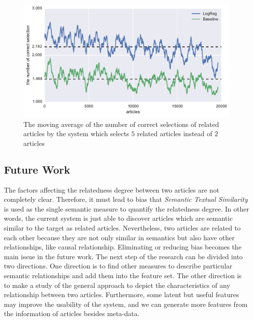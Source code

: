 \begin{figure}[!htb]
    \centering
    \includegraphics[width=\textwidth]{fig/precision_inc_supervised_5}
    \caption[The moving average of the number of correct selection of related articles by the system which selects $5$ related articles]{The moving average of the number of correct selections of related articles by the system which selects $5$ related articles instead of $2$ articles}
    \label{fig:top5}
\end{figure}

\subsection{Future Work}

The factors affecting the relatedness degree between two articles are not completely clear. Therefore, it must lead to bias that \textit{Semantic Textual Similarity} is used as the single semantic measure to quantify the relatedness degree. In other words, the current system is just able to discover articles which are semantic similar to the target as related articles. Nevertheless, two articles are related to each other because they are not only similar in semantics but also have other relationships, like causal relationship. Eliminating or reducing bias becomes the main issue in the future work. The next step of the research can be divided into two directions. One direction is to find other measures to describe particular semantic relationships and add them into the feature set. The other direction is to make a study of the general approach to depict the characteristics of any relationship between two articles. Furthermore, some latent but useful features may improve the usability of the system, and we can generate more features from the information of articles besides meta-data. 


